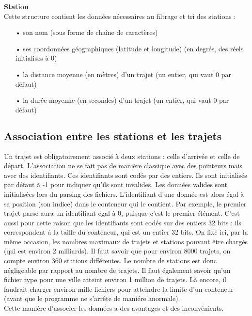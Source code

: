 \documentclass[12pt]{article}
\begin{document}
		\textbf{Station}\\
		Cette structure contient les données nécessaires au filtrage et tri des stations :\\
		\begin{itemize}
			\item[•]son nom (sous forme de chaîne de caractères)
			\item[•]ses coordonnées géographiques (latitude et longitude) (en degrés,
			des réels initialisés à 0)
			\item[•]la distance moyenne (en mètres) d’un trajet (un entier, qui vaut 0 par défaut)
			\item[•]la durée moyenne (en secondes) d’un trajet (un entier, qui vaut 0 par défaut)
		\end{itemize}
			
		\subsection{Association entre les stations et les trajets}
		Un trajet est obligatoirement associé à deux stations : celle d’arrivée et celle de départ.
	L’association ne se fait pas de manière classique avec des pointeurs mais avec des identifiants. Ces identifiants sont codés par des entiers. Ils sont initialisés par défaut à -1 pour indiquer qu’ils sont invalides. Les données valides sont initialisées lors du parsing des fichiers. L’identifiant d’une donnée est alors égal à sa position (son indice) dans le conteneur qui le contient. Par exemple, le premier trajet parsé aura un identifiant égal à 0, puisque c’est le premier élément. C’est aussi pour cette raison que les identifiants sont codés sur des entiers 32 bits : ils correspondent à la taille du conteneur, qui est un entier 32 bits. On fixe ici, par la même occasion, les nombres maximaux de trajets et stations pouvant être chargés (qui est environ 2 milliards). Il faut savoir que pour environ 8000 trajets, on compte environ 360 stations différentes. Le nombre de stations est donc négligeable par rapport au nombre de trajets. Il faut également savoir qu’un fichier type pour une ville atteint environ 1 million de trajets. Là encore, il faudrait charger environ mille fichiers pour atteindre la limite d’un conteneur (avant que le programme ne s'arrête de maniére anormale).\\
	
	Cette manière d’associer les données a des avantages et des inconvénients.\\
			
\end{document}
